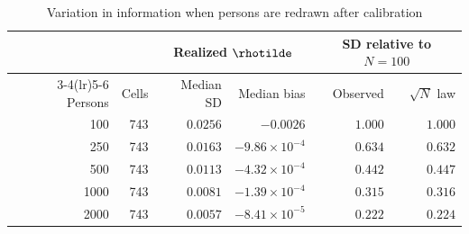 \begin{table}[htbp]\centering
\caption{Variation in information when persons are redrawn after calibration}
\label{tab:s2-replication}
{\small\begin{tabular}{rrrrrr}
\toprule
 & & \multicolumn{2}{c}{Realized $\rhotilde$} & \multicolumn{2}{c}{SD relative to $N = 100$} \\
\cmidrule(lr){3-4}\cmidrule(lr){5-6}
Persons & Cells & Median SD & Median bias & Observed & $\sqrt{N}$ law \\
\midrule
100 & 743 & $0.0256$ & $-0.0026$ & $1.000$ & $1.000$ \\
250 & 743 & $0.0163$ & $-9.86\times 10^{-4}$ & $0.634$ & $0.632$ \\
500 & 743 & $0.0113$ & $-4.32\times 10^{-4}$ & $0.442$ & $0.447$ \\
1000 & 743 & $0.0081$ & $-1.39\times 10^{-4}$ & $0.315$ & $0.316$ \\
2000 & 743 & $0.0057$ & $-8.41\times 10^{-5}$ & $0.222$ & $0.224$ \\
\bottomrule
\end{tabular}}
\end{table}
